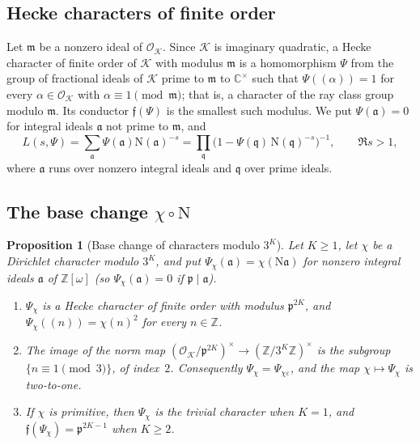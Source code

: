 \documentclass[12pt]{amsart}
\theoremstyle{plain}
\newtheorem{proposition}[theorem]{Proposition}
\theoremstyle{definition}
\theoremstyle{remark}
\newcommand{\Z}{\mathbb{Z}}
\newcommand{\C}{\mathbb{C}}
\newcommand{\Zomega}{\Z[\omega]}
\newcommand{\K}{\mathcal{K}}          %
\newcommand{\OK}{\mathcal{O}_{\K}}
\newcommand{\Nf}{\mathrm{N}}          %
\newcommand{\cond}{\mathfrak{f}}      %
\newcommand{\pp}{\mathfrak{p}}        %
\newcommand{\qq}{\mathfrak{q}}        %
\begin{document}
\subsection{Hecke characters of finite order}

Let $\mathfrak m$ be a nonzero ideal of $\OK$. Since $\K$ is imaginary
quadratic, a Hecke character of finite order of $\K$ with modulus
$\mathfrak m$ is a homomorphism $\Psi$ from the group of fractional ideals
of $\K$ prime to $\mathfrak m$ to $\C^\times$ such that $\Psi((\alpha)) = 1$
for every $\alpha \in \OK$ with $\alpha \equiv 1 \pmod{\mathfrak m}$; that
is, a character of the ray class group modulo $\mathfrak m$. Its conductor
$\cond(\Psi)$ is the smallest such modulus. We put $\Psi(\mathfrak a) = 0$
for integral ideals $\mathfrak a$ not prime to $\mathfrak m$, and
\[
  L(s, \Psi) = \sum_{\mathfrak a} \Psi(\mathfrak a)\Nf(\mathfrak a)^{-s}
  = \prod_{\qq} \bigl(1 - \Psi(\qq)\,\Nf(\qq)^{-s}\bigr)^{-1},
  \qquad \Re s > 1,
\]
where $\mathfrak a$ runs over nonzero integral ideals and $\qq$ over prime
ideals.

\subsection{The base change $\chi\circ\Nf$}

\begin{proposition}[Base change of characters modulo $3^K$]
\label{prop:lift}
Let $K \geq 1$, let $\chi$ be a Dirichlet character modulo $3^K$, and put
$\Psi_\chi(\mathfrak a) = \chi(\Nf\mathfrak a)$ for nonzero integral ideals
$\mathfrak a$ of $\Zomega$ (so $\Psi_\chi(\mathfrak a) = 0$ if
$\pp \mid \mathfrak a$).
\begin{enumerate}[label=(\roman*)]
  \item $\Psi_\chi$ is a Hecke character of finite order with modulus
    $\pp^{2K}$, and $\Psi_\chi((n)) = \chi(n)^2$ for every $n \in \Z$.
  \item The image of the norm map $(\OK/\pp^{2K})^\times \to
    (\Z/3^K\Z)^\times$ is the subgroup $\{n \equiv 1 \pmod 3\}$, of
    index~$2$. Consequently $\Psi_\chi = \Psi_{\chi\varepsilon}$, and the map
    $\chi \mapsto \Psi_\chi$ is two-to-one.
  \item If $\chi$ is primitive, then $\Psi_\chi$ is the trivial character
    when $K = 1$, and $\cond(\Psi_\chi) = \pp^{2K-1}$ when $K \geq 2$.
\end{enumerate}
\end{proposition}
\end{document}
